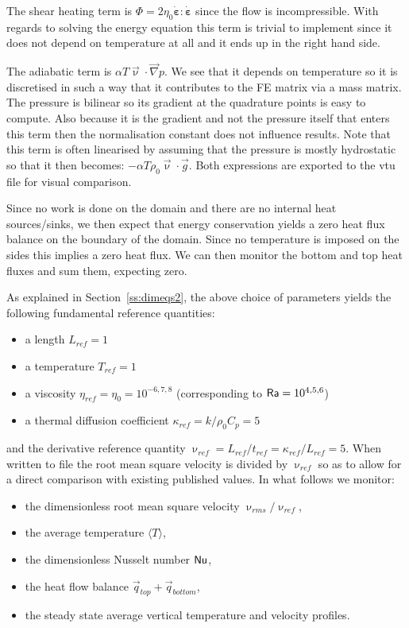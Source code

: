 The shear heating term is $\Phi=2 \eta_0 \dot{\bm \varepsilon}:\dot{\bm \varepsilon}$ since the flow
is incompressible. With regards to solving the energy equation this term is trivial to implement 
since it does not depend on temperature at all and it ends up in the right hand side.

The adiabatic term is $\alpha T \vec{\upnu}\cdot\vec\nabla p$. 
We see that it depends on temperature so it is discretised in such a 
way that it contributes to the FE matrix via a mass matrix. 
The pressure is bilinear so its gradient at the quadrature points is easy to compute.  
Also because it is the gradient and not the pressure itself that enters this term then 
the normalisation constant does not influence results.
Note that this term is often linearised by assuming that the pressure is mostly hydrostatic
so that it then becomes: $- \alpha T \rho_0 \vec\upnu\cdot\vec{g}$.
Both expressions are exported to the vtu file for visual comparison.

Since no work is done on the domain and there are no internal heat sources/sinks, we then 
expect that energy conservation yields a zero heat flux balance on the boundary of the domain. 
Since no temperature is imposed on the sides this implies a zero heat flux. 
We can then monitor the bottom and top heat fluxes and sum them, expecting zero.  

As explained in Section~\ref{ss:dimeqs2}, the above choice of parameters yields the following 
fundamental reference quantities:
\begin{itemize}
\item a length $L_{ref}=1$ 
\item a temperature $T_{ref}=1$ 
\item a viscosity $\eta_{ref}=\eta_0=10^{-6,7,8}$ (corresponding to ${\mathsf{Ra}}=10^{4,5,6}$) 
\item a thermal diffusion coefficient $\kappa_{ref}=k/\rho_0 C_p = 5$ 
\end{itemize}
and the derivative reference quantity $\upnu_{ref} = L_{ref} / t_{ref} = \kappa_{ref}/L_{ref} = 5$.
When written to file the root mean square velocity is divided by $\upnu_{ref}$ so as to allow
for a direct comparison with existing published values.
In what follows we monitor:
\begin{itemize}
\item the dimensionless root mean square velocity $\upnu_{rms}/\upnu_{ref}$,
\item the average temperature $\langle T \rangle$,
\item the dimensionless Nusselt number ${\mathsf{Nu}}$,
\item the heat flow balance $\vec{q}_{top}+\vec{q}_{bottom}$,
\item the steady state average vertical temperature and velocity profiles.
\end{itemize}

